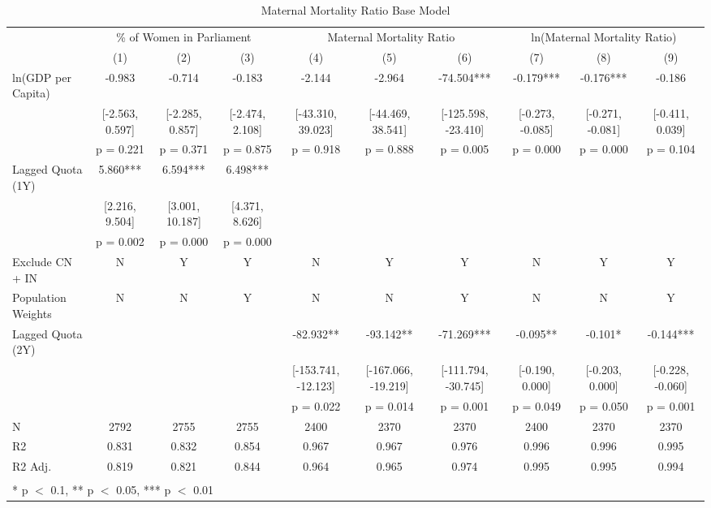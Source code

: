 \begin{table}

\caption{Maternal Mortality Ratio Base Model}
\centering
\begin{tabular}[t]{lccccccccc}
\toprule
\multicolumn{1}{c}{ } & \multicolumn{3}{c}{\% of Women in Parliament} & \multicolumn{3}{c}{Maternal Mortality Ratio} & \multicolumn{3}{c}{ln(Maternal Mortality Ratio)} \\
\cmidrule(l{3pt}r{3pt}){2-4} \cmidrule(l{3pt}r{3pt}){5-7} \cmidrule(l{3pt}r{3pt}){8-10}
  & (1) & (2) & (3) & (4) & (5) & (6) & (7) & (8) & (9)\\
\midrule
ln(GDP per Capita) & -0.983 & -0.714 & -0.183 & -2.144 & -2.964 & -74.504*** & -0.179*** & -0.176*** & -0.186\\
 & [-2.563, 0.597] & [-2.285, 0.857] & [-2.474, 2.108] & [-43.310, 39.023] & [-44.469, 38.541] & [-125.598, -23.410] & [-0.273, -0.085] & [-0.271, -0.081] & [-0.411, 0.039]\\
 & p = 0.221 & p = 0.371 & p = 0.875 & p = 0.918 & p = 0.888 & p = 0.005 & p = 0.000 & p = 0.000 & p = 0.104\\
Lagged Quota (1Y) & 5.860*** & 6.594*** & 6.498*** &  &  &  &  &  & \\
 & [2.216, 9.504] & [3.001, 10.187] & [4.371, 8.626] &  &  &  &  &  & \\
 & p = 0.002 & p = 0.000 & p = 0.000 &  &  &  &  &  & \\
Exclude CN + IN & N & Y & Y & N & Y & Y & N & Y & Y\\
Population Weights & N & N & Y & N & N & Y & N & N & Y\\
Lagged Quota (2Y) &  &  &  & -82.932** & -93.142** & -71.269*** & -0.095** & -0.101* & -0.144***\\
 &  &  &  & [-153.741, -12.123] & [-167.066, -19.219] & [-111.794, -30.745] & [-0.190, 0.000] & [-0.203, 0.000] & [-0.228, -0.060]\\
 &  &  &  & p = 0.022 & p = 0.014 & p = 0.001 & p = 0.049 & p = 0.050 & p = 0.001\\
\midrule
N & 2792 & 2755 & 2755 & 2400 & 2370 & 2370 & 2400 & 2370 & 2370\\
R2 & 0.831 & 0.832 & 0.854 & 0.967 & 0.967 & 0.976 & 0.996 & 0.996 & 0.995\\
R2 Adj. & 0.819 & 0.821 & 0.844 & 0.964 & 0.965 & 0.974 & 0.995 & 0.995 & 0.994\\
\bottomrule
\multicolumn{10}{l}{\textsuperscript{} * p $<$ 0.1, ** p $<$ 0.05, *** p $<$ 0.01}\\
\end{tabular}
\end{table}
